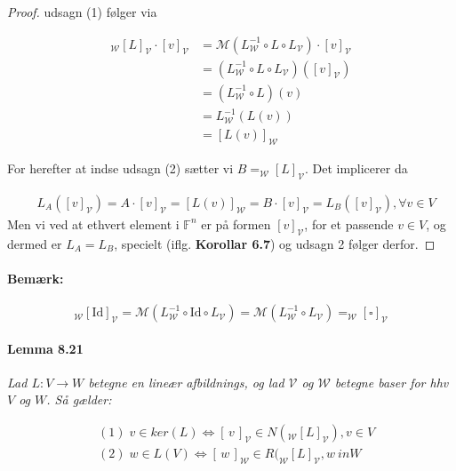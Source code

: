 \documentclass[paper=a4, fontsize=11pt]{scrartcl} %
\begin{document}
	\begin{proof}
		
		udsagn (1) følger via
		
		\begin{align*}
		_{\mathcal{W}}[L]_{\mathcal{V}} \cdot [v]_{\mathcal{V}} &= \mathcal{M}(L_{\mathcal{W}}^{-1} \circ L \circ L_{\mathcal{V}}) \cdot [v]_\mathcal{V}\\
		&=(L_{\mathcal{W}}^{-1} \circ L \circ L_{\mathcal{V}})([v]_{\mathcal{V}})\\
		&=(L_{\mathcal{W}}^{-1} \circ L)(v)\\
		&=L_{\mathcal{W}}^{-1}(L(v))\\
		&=[L(v)]_{\mathcal{W}}
		\end{align*}
		
		For herefter at indse udsagn (2) sætter vi $B = _{\mathcal{W}}[L]_{\mathcal{V}}$. Det implicerer da
		
		\begin{align*}
		&L_A([v]_{\mathcal{V}}) = A \cdot [v]_{\mathcal{V}} = [L(v)]_{\mathcal{W}} = B \cdot [v]_{\mathcal{V}} = L_B([v]_{\mathcal{V}}), \forall v \in V
		\end{align*}
		Men vi ved at ethvert element i $\mathbb{F}^n$ er på formen $[v]_{\mathcal{V}}$, for et passende $v \in V$, og dermed er $L_A = L_B$, specielt (iflg. \textbf{Korollar 6.7}) og udsagn 2 følger derfor.
		
		
	\end{proof}
	
	\paragraph{Bemærk:}
	\[_{\mathcal{W}}[\text{Id}]_{\mathcal{V}} = \mathcal{M}(L_{\mathcal{W}}^{-1} \circ \text{Id} \circ L_{\mathcal{V}}) = \mathcal{M}(L_{\mathcal{W}}^{-1} \circ L_{\mathcal{V}}) = _{\mathcal{W}}[{\scriptstyle\square}]_{\mathcal{V}}\]
	
	\paragraph{Lemma 8.21} \textit{Lad $L : V \rightarrow W$ betegne en lineær afbildnings, og lad $\mathcal{V}$ og $\mathcal{W}$ betegne baser for hhv $V$ og $W$. Så gælder:}
	
	\begin{align*}
	&(1) \; v \in ker(L) \Leftrightarrow [\,v\,]_{\mathcal{V}} \in N(_{\mathcal{W}}[L]_{\mathcal{V}}), v \in V \\
	&(2) \; w \in L(V) \Leftrightarrow [\,w\,]_{\mathcal{W}} \in R(_{\mathcal{W}}[L]_{\mathcal{V}}, w \ in W
	\end{align*}
	
\end{document}
